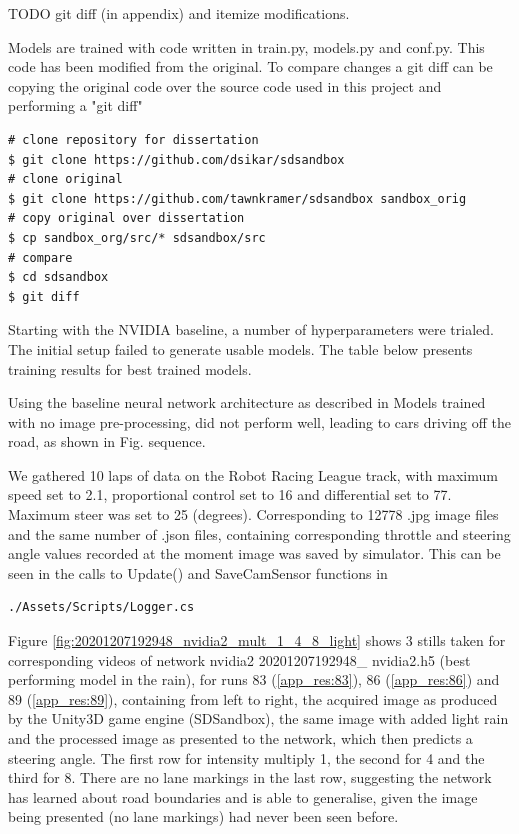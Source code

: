 TODO git diff (in appendix) and itemize modifications.
    
Models are trained with code written in train.py, models.py and conf.py. This code has been modified from the original. To compare changes a git diff can be copying the original code over the source code used in this project and performing a "git diff"
\begin{verbatim}
# clone repository for dissertation
$ git clone https://github.com/dsikar/sdsandbox
# clone original
$ git clone https://github.com/tawnkramer/sdsandbox sandbox_orig
# copy original over dissertation
$ cp sandbox_org/src/* sdsandbox/src
# compare
$ cd sdsandbox 
$ git diff
\end{verbatim}


Starting with the NVIDIA baseline, a number of hyperparameters were trialed. The initial setup failed to generate usable models. 
The table below presents training results for best trained models.



Using the baseline neural network architecture as described in 
Models trained with no image pre-processing, did not perform well, leading to cars driving off the road, as shown in Fig.  sequence.

We gathered 10 laps of data on the Robot Racing League track, with maximum speed set to 2.1, proportional control set to 16 and differential set to 77. Maximum steer was set to 25 (degrees). Corresponding to 12778 .jpg image files and the same number of  .json files, containing corresponding throttle and steering angle values recorded at the moment image was saved by simulator. This can be seen in the calls to Update() and SaveCamSensor functions in  
\begin{verbatim}
./Assets/Scripts/Logger.cs
\end{verbatim}



Figure \ref{fig:20201207192948_nvidia2_mult_1_4_8_light} shows 3 stills taken for corresponding videos of network nvidia2 20201207192948\_ nvidia2.h5 (best performing model in the rain), for runs 83 (\ref{app_res:83}), 86 (\ref{app_res:86}) and 89 (\ref{app_res:89}), containing from left to right, the acquired image as produced by the Unity3D game engine (SDSandbox), the same image with added light rain and the processed image as presented to the network, which then predicts a steering angle. The first row for intensity multiply 1, the second for 4 and the third for 8. There are no lane markings in the last row, suggesting the network has learned about road boundaries and is able to generalise, given the image being presented (no lane markings) had never been seen before.

